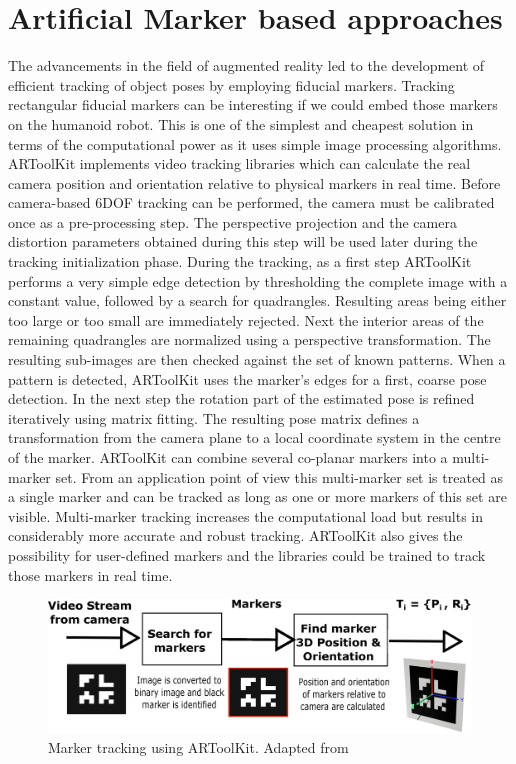 \section{Artificial Marker based approaches}
	The advancements in the field of augmented reality led to the development of efficient tracking of object poses by employing fiducial markers. Tracking rectangular fiducial markers can be interesting if we could embed those markers on the humanoid robot. This is one of the simplest and cheapest solution in terms of the computational power as it uses simple image processing algorithms. ARToolKit\cite{kato1999marker} implements video tracking libraries which can calculate the real camera position and orientation relative to physical markers in real time. Before camera-based 6DOF tracking can be performed, the camera must be calibrated once as a pre-processing step. The perspective projection and the camera distortion parameters obtained during this step will be used later during the tracking initialization phase. During the tracking, as a first step ARToolKit performs a very simple edge detection by thresholding the complete image with a constant value, followed by a search for quadrangles. Resulting areas being either too large or too small are immediately rejected. Next the interior areas of the remaining quadrangles are normalized using a perspective transformation. The resulting sub-images are then checked against the set of known patterns. When a pattern is detected, ARToolKit uses the marker’s edges for a first, coarse pose detection. In the next step the rotation part of the estimated pose is refined iteratively using matrix fitting. The resulting pose matrix defines a transformation from the camera plane to a local coordinate system in the centre of the marker. ARToolKit can combine several co-planar markers into a multi-marker set. From an application point of view this multi-marker set is treated as a single marker and can be tracked as long as one or more markers of this set are visible. Multi-marker tracking increases the computational load but results in considerably more accurate and robust tracking. ARToolKit also gives the possibility for user-defined markers and the libraries could be trained to track those markers in real time.
\begin{figure}[H]
\centering
\includegraphics[width=1\textwidth]{assets/artoolkit.eps}
\caption[Marker tracking using ARToolKit]{Marker tracking using ARToolKit. {Adapted from \cite{kato1999marker}}}
\label{fig:artoolkit}
\end{figure}
